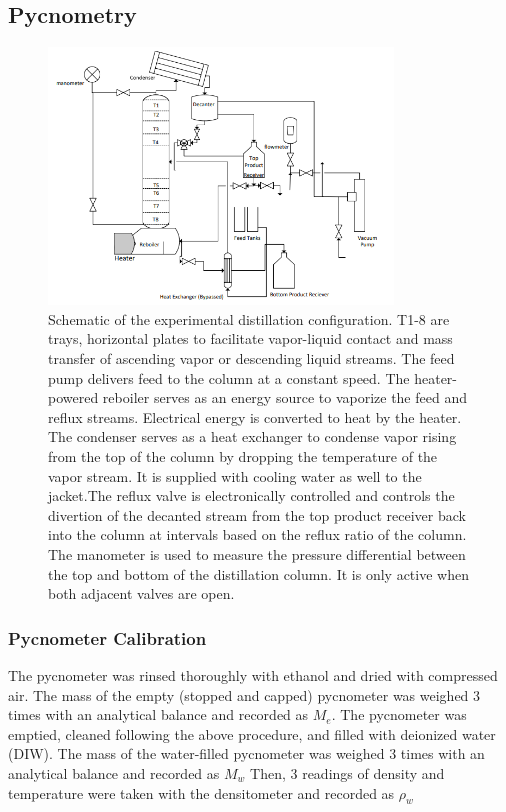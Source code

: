 \documentclass[lettersize,journal]{IEEEtran}
\begin{document}
	\subsection{Pycnometry}
	\begin{figure}[!t]
		\centering
		\includegraphics[width=3.6in]{Drawing}
		\caption{Schematic of the experimental distillation configuration. T1-8 are trays, horizontal plates to facilitate vapor-liquid contact and mass transfer of ascending vapor or descending liquid streams. The feed pump delivers feed to the column at a constant speed. The heater-powered reboiler serves as an energy source to vaporize the feed and reflux streams. Electrical energy is converted to heat by the heater. The condenser serves as a heat exchanger to condense vapor rising from the top of the column by dropping the temperature of the vapor stream. It is supplied with cooling water as well to the jacket.The reflux valve is electronically controlled and controls the divertion of the decanted stream from the top product receiver back into the column at intervals based on the reflux ratio of the column. The manometer is used to measure the pressure differential between the top and bottom of the distillation column. It is only active when both adjacent valves are open.}
		\label{fig_2}
	\end{figure}
	\subsubsection{Pycnometer Calibration}
	The pycnometer was rinsed thoroughly with ethanol and dried with compressed air. The mass of the empty (stopped and capped) pycnometer was weighed 3 times with an analytical balance and recorded as $M_{e}$. 
	The pycnometer was emptied, cleaned following the above procedure, and filled with deionized water (DIW). The mass of the water-filled pycnometer was weighed 3 times with an analytical balance and recorded as $M_{w}$ Then, 3 readings of density and temperature were taken with the densitometer and recorded as $\rho_{w}$
\end{document}
